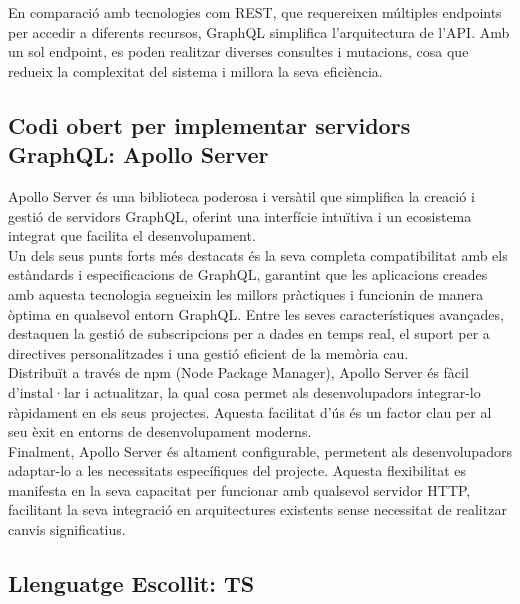 \documentclass[a4paper,12pt,twoside]{ThesisStyle}
\begin{document}
En comparació amb tecnologies com REST, que requereixen múltiples endpoints per accedir a diferents recursos, GraphQL simplifica l'arquitectura de l'API. Amb un sol endpoint, es poden realitzar diverses consultes i mutacions, cosa que redueix la complexitat del sistema i millora la seva eficiència.\\



\subsection{Codi obert per implementar servidors GraphQL: Apollo Server}
\label{Codi obert per implementar servidors GraphQL: Apollo Server}


Apollo Server és una biblioteca poderosa i versàtil que simplifica la creació i gestió de servidors GraphQL, oferint una interfície intuïtiva i un ecosistema integrat que facilita el desenvolupament.\\

Un dels seus punts forts més destacats és la seva completa compatibilitat amb els estàndards i especificacions de GraphQL, garantint que les aplicacions creades amb aquesta tecnologia segueixin les millors pràctiques i funcionin de manera òptima en qualsevol entorn GraphQL. Entre les seves característiques avançades, destaquen la gestió de subscripcions per a dades en temps real, el suport per a directives personalitzades i una gestió eficient de la memòria cau.\\

Distribuït a través de npm (Node Package Manager), Apollo Server és fàcil d'instal·lar i actualitzar, la qual cosa permet als desenvolupadors integrar-lo ràpidament en els seus projectes. Aquesta facilitat d'ús és un factor clau per al seu èxit en entorns de desenvolupament moderns.\\

Finalment, Apollo Server és altament configurable, permetent als desenvolupadors adaptar-lo a les necessitats específiques del projecte. Aquesta flexibilitat es manifesta en la seva capacitat per funcionar amb qualsevol servidor HTTP, facilitant la seva integració en arquitectures existents sense necessitat de realitzar canvis significatius.

\subsection{Llenguatge Escollit: TS}
\label{subsec:Llenguatge Escillit: TS}
\end{document}
